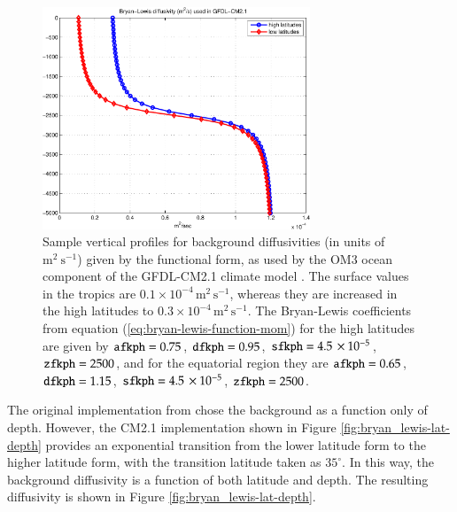 \begin{figure}[h!t]
\begin{center}
\includegraphics[angle=0,width=8cm]{./figs/bryan_lewis_cm2p1.pdf}
\caption[Bryan-Lewis background diffusivities]{\sf Sample vertical
  profiles for background diffusivities (in units of
  $\mbox{m}^{2}~\mbox{s}^{-1}$) given by the \cite{BryanLewis1979}
  functional form, as used by the OM3 ocean component of the
  GFDL-CM2.1 climate model \citep{OMDT2005a}.  The surface values in
  the tropics are $0.1 \times 10^{-4} \, \mbox{m}^2 \, \mbox{s}^{-1}$,
  whereas they are increased in the high latitudes to $0.3 \times
  10^{-4} \, \mbox{m}^2 \, \mbox{s}^{-1}$.
The Bryan-Lewis coefficients from equation
(\ref{eq:bryan-lewis-function-mom}) for the high latitudes are given
by 
${\tt afkph} =0.75$,
${\tt dfkph} =0.95$,
${\tt sfkph} =4.5 \, \times 10^{-5}$,
${\tt zfkph} =2500$,
and for the equatorial region they are 
${\tt afkph} =0.65$,
${\tt dfkph} =1.15$,
${\tt sfkph} = 4.5 \, \times 10^{-5}$,
${\tt zfkph} =2500$. }
\label{fig:bryan_lewis-profiles}
\end{center}
\end{figure}

The original implementation from \cite{BryanLewis1979} chose the
background as a function only of depth.  However, the CM2.1
implementation shown in Figure \ref{fig:bryan_lewis-lat-depth}
provides an exponential transition from the lower latitude form to the
higher latitude form, with the transition latitude taken as
$35^{\circ}$.  In this way, the background diffusivity is a function
of both latitude and depth.  The resulting diffusivity is shown in
Figure \ref{fig:bryan_lewis-lat-depth}.

